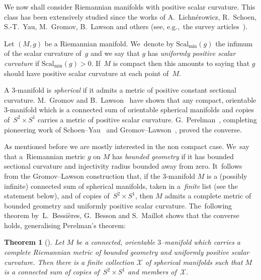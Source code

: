 \documentclass[pdftex]{sigma}
\numberwithin{equation}{section}
\newtheorem{theor}{Theorem}[section]
\def\Smin{\textrm{Scal}_\mathrm{min}}
\begin{document}
We now shall consider Riemannian manifolds with positive scalar curvature. This class has been extensively studied since the works of A.~Lichn\'erowicz, R.~Schoen, S.-T.~Yau, M.~Gromov, B.~Lawson and others (see, e.g.,~the survey articles~\cite{gromov:sign,rosenberg:report}).

Let $(M,g)$ be a Riemannian manifold. We~denote by $\Smin(g)$ the infimum of the scalar curvature of~$g$ and we say that $g$ has
{\it uniformly positive scalar curvature} if $\Smin(g)>0$. If~$M$ is compact then this amounts to saying that $g$ should have positive scalar curvature at each point of~$M$.

A $3$-manifold is {\it spherical} if it admits a metric of positive constant sectional curvature. M.~Gromov and B.~Lawson~\cite{gl:spin} have shown that any compact, orientable $3$-manifold which is a connected sum of orientable spherical manifolds and copies of~$S^2\times S^1$ carries a metric of positive scalar curvature. G.~Perelman~\cite{Per2}, completing pioneering work of Schoen--Yau~\cite{SchoenYau:incompressible} and Gromov--Lawson~\cite{GromovLawson}, proved the converse.

As mentioned before we are mostly interested in the non compact case. We~say that a~Riemannian metric $g$ on $M$ has {\it bounded geometry} if it has bounded sectional curvature
and injec\-tivity radius bounded away from zero. It~follows from the Gromov--Lawson construction that, if the $3$-manifold $M$ is a (possibly infinite) connected sum of spherical manifolds, taken in a~{\it finite} list (see the statement below), and of copies of~$S^2\times S^1$, then $M$ admits
a complete metric of bounded geometry and uniformly positive scalar curvature. The~following theorem by~L.~Bessières, G.~Besson and S.~Maillot shows that the converse holds, generalising Perelman's theorem:

\begin{theor}[\cite{BBM}]\label{thm:positive scalar general}
Let $M$ be a connected, orientable $3$--manifold which carries a complete
Riemannian metric of bounded
geometry and uniformly positive scalar curvature. Then there is a finite collection $\mathcal X$ of spherical manifolds such that $M$ is a connected sum of copies of~$S^2\times S^1$ and members of~$\mathcal X$.
\end{theor}
\end{document}
